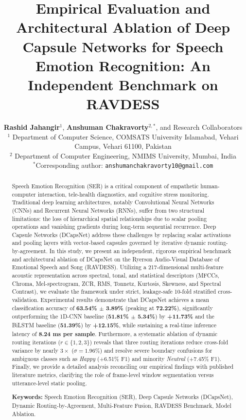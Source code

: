 \documentclass[twocolumn]{article}
\title{\textbf{\Large Empirical Evaluation and Architectural Ablation of Deep Capsule Networks for Speech Emotion Recognition: An Independent Benchmark on RAVDESS}}
\author{
  \textbf{Rashid Jahangir}$^{1}$, \textbf{Anshuman Chakravorty}$^{2,*}$, and Research Collaborators \\
  \small $^{1}$ Department of Computer Science, COMSATS University Islamabad, Vehari Campus, Vehari 61100, Pakistan \\
  \small $^{2}$ Department of Computer Engineering, NMIMS University, Mumbai, India \\
  \small $^{*}$Corresponding author: \texttt{anshumanchakravorty10@gmail.com}
}
\date{}
\begin{document}
\maketitle

\begin{abstract}
\noindent Speech Emotion Recognition (SER) is a critical component of empathetic human-computer interaction, tele-health diagnostics, and cognitive stress monitoring. Traditional deep learning architectures, notably Convolutional Neural Networks (CNNs) and Recurrent Neural Networks (RNNs), suffer from two structural limitations: the loss of hierarchical spatial relationships due to scalar pooling operations and vanishing gradients during long-term sequential recurrence. Deep Capsule Networks (DCapsNet) address these challenges by replacing scalar activations and pooling layers with vector-based capsules governed by iterative dynamic routing-by-agreement. In this study, we present an independent, rigorous empirical benchmark and architectural ablation of DCapsNet on the Ryerson Audio-Visual Database of Emotional Speech and Song (RAVDESS). Utilizing a 217-dimensional multi-feature acoustic representation across spectral, tonal, and statistical descriptors (MFCCs, Chroma, Mel-spectrogram, ZCR, RMS, Tonnetz, Kurtosis, Skewness, and Spectral Contrast), we evaluate the framework under strict, leakage-safe 10-fold stratified cross-validation. Experimental results demonstrate that DCapsNet achieves a mean classification accuracy of \textbf{63.54\% $\pm$ 3.89\%} (peaking at \textbf{72.22\%}), significantly outperforming the 1D-CNN baseline (\textbf{51.81\% $\pm$ 5.34\%}) by \textbf{+11.73\%} and the BiLSTM baseline (\textbf{51.39\%}) by \textbf{+12.15\%}, while sustaining a real-time inference latency of \textbf{8.24 ms per sample}. Furthermore, a systematic ablation of dynamic routing iterations ($r \in \{1, 2, 3\}$) reveals that three routing iterations reduce cross-fold variance by nearly $3\times$ ($\sigma = 1.96\%$) and resolve severe boundary confusions for ambiguous classes such as \textit{Happy} (+6.51\% F1) and minority \textit{Neutral} (+7.45\% F1). Finally, we provide a detailed analysis reconciling our empirical findings with published literature metrics, clarifying the role of frame-level window segmentation versus utterance-level static pooling.
\vspace{2mm}

\noindent \textbf{Keywords:} Speech Emotion Recognition (SER), Deep Capsule Networks (DCapsNet), Dynamic Routing-by-Agreement, Multi-Feature Fusion, RAVDESS Benchmark, Model Ablation.
\end{abstract}
\end{document}

